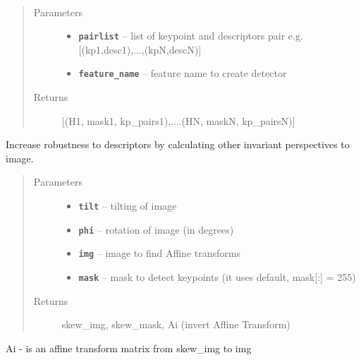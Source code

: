\documentclass[letterpaper,10pt,english]{sphinxmanual}
\begin{document}
\begin{fulllineitems}
\label{RRtoolbox.lib:RRtoolbox.lib.descriptors.MATCH_multiple}~\begin{quote}\begin{description}
\item[{Parameters}] \leavevmode\begin{itemize}
\item {} 
\textbf{\texttt{pairlist}} -- list of keypoint and descriptors pair e.g. {[}(kp1,desc1),...,(kpN,descN){]}

\item {} 
\textbf{\texttt{feature\_name}} -- feature name to create detector

\end{itemize}

\item[{Returns}] \leavevmode
{[}(H1, mask1, kp\_pairs1),....(HN, maskN, kp\_pairsN){]}

\end{description}\end{quote}

\end{fulllineitems}


\begin{fulllineitems}
\label{RRtoolbox.lib:RRtoolbox.lib.descriptors.affine_skew}
Increase robustness to descriptors by calculating other invariant perspectives to image.
\begin{quote}\begin{description}
\item[{Parameters}] \leavevmode\begin{itemize}
\item {} 
\textbf{\texttt{tilt}} -- tilting of image

\item {} 
\textbf{\texttt{phi}} -- rotation of image (in degrees)

\item {} 
\textbf{\texttt{img}} -- image to find Affine transforms

\item {} 
\textbf{\texttt{mask}} -- mask to detect keypoints (it uses default, mask{[}:{]} = 255)

\end{itemize}

\item[{Returns}] \leavevmode
skew\_img, skew\_mask, Ai (invert Affine Transform)

\end{description}\end{quote}

Ai - is an affine transform matrix from skew\_img to img

\end{fulllineitems}
\end{document}

